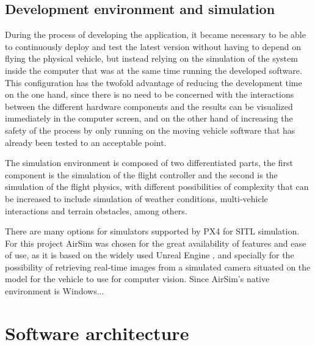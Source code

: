 \subsection{Development environment and simulation}
During the process of developing the application, it became necessary to be able to continuously deploy and test the latest version without having to depend on flying the physical vehicle, but instead relying on the simulation of the system inside the computer that was at the same time running the developed software.
This configuration has the twofold advantage of reducing the development time on the one hand, since there is no need to be concerned with the interactions between the different hardware components and the results can be visualized immediately in the computer screen, and on the other hand of increasing the safety of the process by only running on the moving vehicle software that has already been tested to an acceptable point.

The simulation environment is composed of two differentiated parts, the first component is the simulation of the flight controller and the second is the simulation of the flight physics, with different possibilities of complexity that can be increased to include simulation of weather conditions, multi-vehicle interactions and terrain obstacles, among others.

There are many options for simulators supported by PX4 for SITL simulation.
For this project AirSim  was chosen for the great availability of features and ease of use, as it is based on the widely used Unreal Engine , and specially for the possibility of retrieving real-time images from a simulated camera situated on the model for the vehicle to use for computer vision.
Since AirSim's native environment is Windows...

\section{Software architecture}

